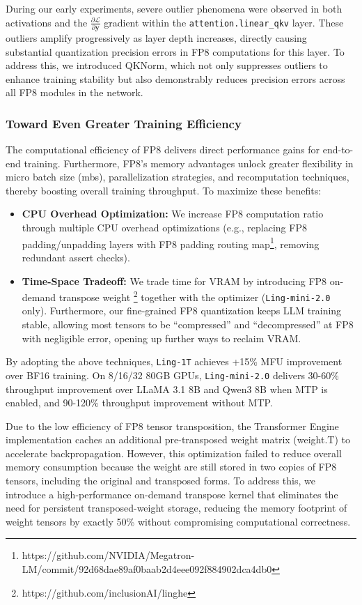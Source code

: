 During our early experiments, severe outlier phenomena were observed in both activations and the $\frac{\partial \mathcal{L}}{\partial \mathbf{y}}$ gradient within the \texttt{attention.linear\_qkv} layer. 
These outliers amplify progressively as layer depth increases, directly causing substantial quantization precision errors in FP8 computations for this layer. 
To address this, we introduced QKNorm, which not only suppresses outliers to enhance training stability but also demonstrably reduces precision errors across all FP8 modules in the network.

\subsubsection{Toward Even Greater Training Efficiency}

The computational efficiency of FP8 delivers direct performance gains for end-to-end training. Furthermore, FP8's memory advantages unlock greater flexibility in micro batch size (mbs), parallelization strategies, and recomputation techniques, thereby boosting overall training throughput. To maximize these benefits:
\begin{itemize}[leftmargin=1.5em]
    \item \textbf{CPU Overhead Optimization:} We increase FP8 computation ratio through multiple CPU overhead optimizations (e.g., replacing FP8 padding/unpadding layers with FP8 padding routing map\footnote{https://github.com/NVIDIA/Megatron-LM/commit/92d68dae89af0baab2d4eee092f884902dca4db0}, removing redundant assert checks).
    \item \textbf{Time-Space Tradeoff:} We trade time for VRAM by introducing FP8 on-demand transpose weight \footnote{https://github.com/inclusionAI/linghe} together with the optimizer (\texttt{Ling-mini-2.0} only). Furthermore, our fine-grained FP8 quantization keeps LLM training stable, allowing most tensors to be ``compressed'' and ``decompressed'' at FP8 with negligible error, opening up further ways to reclaim VRAM.
\end{itemize}
By adopting the above techniques, \texttt{Ling-1T} achieves +15\% MFU improvement over BF16 training. On 8/16/32 80GB GPUs, \texttt{Ling-mini-2.0} delivers 30-60\% throughput improvement over LLaMA 3.1 8B and Qwen3 8B when MTP is enabled, and 90-120\% throughput improvement without MTP.

Due to the low efficiency of FP8 tensor transposition, the Transformer Engine implementation caches an additional pre-transposed weight matrix (weight.T) to accelerate backpropagation. However, this optimization failed to reduce overall memory consumption because the weight are still stored in two copies of FP8 tensors, including the original and transposed forms. To address this, we introduce a high-performance on-demand transpose kernel that eliminates the need for persistent transposed-weight storage, reducing the memory footprint of weight tensors by exactly 50\% without compromising computational correctness.

